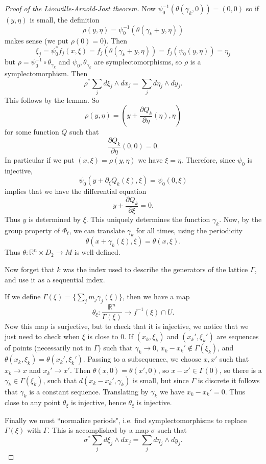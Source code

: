 \documentclass[12pt]{report}
\newcommand{\RR}{\mathbb{R}}
\theoremstyle{definition}
\begin{document}
\begin{proof}[Proof of the Liouville-Arnold-Jost theorem]
Now $\psi_0^{-1}(\theta(\gamma_k, 0)) = (0, 0)$ so if $(y, \eta)$ is small, the definition
$$\rho(y, \eta) = \psi_0^{-1}(\theta(\gamma_k + y, \eta))$$
makes sense (we put $\rho(0) = 0$). Then
$$\xi_j = \psi_0^*f_j(x, \xi) = f_j(\theta(\gamma_k + y, \eta)) = f_j(\psi_0(y, \eta)) = \eta_j$$
but $\rho = \psi_0^{-1} \circ \theta_{\gamma_k}$ and $\psi_0,\theta_{\gamma_k}$ are symplectomorphisms, so $\rho$ is a symplectomorphism.
Then
$$\rho^*\sum_jd\xi_j \wedge dx_j = \sum_j d\eta_j \wedge dy_j.$$
This follows by the lemma. So
$$\rho(y, \eta) = (y + \frac{\partial Q_k}{\partial \eta}(\eta), \eta)$$
for some function $Q$ such that
$$\frac{\partial Q_k}{\partial \eta}(0, 0) = 0.$$
In particular if we put $(x, \xi) = \rho(y, \eta)$ we have $\xi = \eta$.
Therefore, since $\psi_0$ is injective,
$$\psi_0(y + \partial_\xi Q_k(\xi), \xi) = \psi_0(0,\xi)$$
implies that we have the differential equation
$$y + \frac{\partial Q_k}{\partial \xi} = 0.$$
Thus $y$ is determined by $\xi$.
This uniquely determines the function $\gamma_k$.
Now, by the group property of $\Phi_t$, we can translate $\gamma_k$ for all times, using the periodicity
$$\theta(x + \gamma_k(\xi), \xi) = \theta(x, \xi).$$
Thus $\theta: \RR^n \times D_2 \to M$ is well-defined.

Now forget that $k$ was the index used to describe the generators of the lattice $\Gamma$, and use it as a sequential index.

If we define $\Gamma(\xi) = \{\sum_j m_j\gamma_j(\xi)\}$, then we have a map
$$\theta_\xi: \frac{\RR^n}{\Gamma(\xi)} \to f^{-1}(\xi) \cap U.$$
Now this map is surjective, but to check that it is injective, we notice that we just need to check when $\xi$ is close to $0$.
If $(x_k, \xi_k)$ and $(x_k', \xi_k')$ are sequences of points (necessarily not in $\Gamma$) such that $\gamma_k \to 0$, $x_k - x_k' \notin \Gamma(\xi_k)$, and $\theta(x_k, \xi_k) = \theta(x_k', \xi_k')$.
Passing to a subsequence, we choose $x,x'$ such that $x_k \to x$ and $x_k' \to x'$. Then $\theta(x, 0) = \theta(x', 0)$, so $x - x' \in \Gamma(0)$, so there is a $\gamma_k \in \Gamma(\xi_k)$, such that $d(x_k - x_k', \gamma_k)$ is small, but since $\Gamma$ is discrete it follows that $\gamma_k$ is a constant sequence.
Translating by $\gamma_k$ we have $x_k - x_k' = 0 $. Thus close to any point $\theta_\xi$ is injective, hence $\theta_\xi$ is injective.

Finally we must ``normalize periods", i.e. find symplectomorphisms to replace $\Gamma(\xi)$ with $\Gamma$.
This is accomplished by a map $\sigma$ such that
$$\sigma^*\sum_j d\xi_j\wedge dx_j = \sum_j d\eta_j \wedge dy_j.$$
\end{proof}
\end{document}
